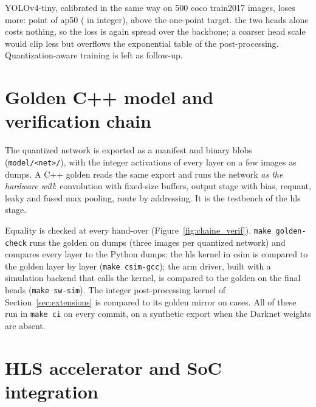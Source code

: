 \documentclass[11pt,a4paper]{article}
\begin{document}
YOLOv4-tiny, calibrated in the same way on 500 \gls{coco} train2017 images, loses more:
 point of \gls{ap}50 ( in integer), above
the one-point target.  the two heads alone costs nothing, so the loss is again
spread over the backbone; a coarser head scale would clip less but overflows the exponential
table of the post-processing. Quantization-aware training is left as follow-up.

\section{Golden C++ model and verification chain}\label{sec:golden}

The quantized network is exported as a \gls{manifest} and binary blobs
(\texttt{model/<net>/}), with the integer activations of every layer on a few images as
\glspl{dump}. A C++ \gls{golden} reads the same export and runs the network \emph{as the hardware
will}:  convolution with fixed-size buffers, output stage with bias, \gls{requant},
leaky and fused max pooling, route by addressing. It is the testbench of the \gls{hls} stage.

Equality is checked at every hand-over (Figure~\ref{fig:chaine_verif}).
\texttt{make golden-check} runs the \gls{golden} on  \glspl{dump} (three
images per quantized network) and compares every layer to the Python \glspl{dump}; the \gls{hls} kernel
in \gls{csim} is compared to the \gls{golden} layer by layer (\texttt{make csim-gcc});
the \gls{arm} driver, built with a simulation backend that calls the  kernel, is
compared to the \gls{golden} on the final heads (\texttt{make sw-sim}). The integer
post-processing kernel of Section~\ref{sec:extensions} is compared to its golden mirror on
 cases. All of these run in \texttt{make ci} on every commit, on
a synthetic export when the Darknet weights are absent.


\section{HLS accelerator and SoC integration}\label{sec:hls}
\end{document}
